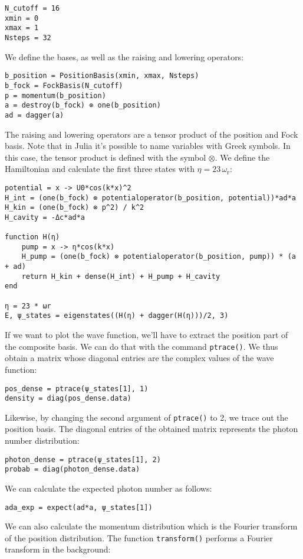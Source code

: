 \begin{lstlisting}
N_cutoff = 16
xmin = 0
xmax = 1
Nsteps = 32
\end{lstlisting}We define the bases, as well as the raising and lowering operators:

\begin{lstlisting}
b_position = PositionBasis(xmin, xmax, Nsteps)
b_fock = FockBasis(N_cutoff)
p = momentum(b_position)
a = destroy(b_fock) ⊗ one(b_position)
ad = dagger(a)
\end{lstlisting}The raising and lowering operators are a tensor product of the position and Fock basis. Note that in Julia it's possible to name variables with Greek symbols. In this case, the tensor product is defined with the symbol $\otimes$. We define the Hamiltonian and calculate the first three states with $\eta = 23 \, \omega_\text{r}$:

\begin{lstlisting}
potential = x -> U0*cos(k*x)^2
H_int = (one(b_fock) ⊗ potentialoperator(b_position, potential))*ad*a
H_kin = (one(b_fock) ⊗ p^2) / k^2
H_cavity = -Δc*ad*a

function H(η)
    pump = x -> η*cos(k*x)
    H_pump = (one(b_fock) ⊗ potentialoperator(b_position, pump)) * (a + ad)
    return H_kin + dense(H_int) + H_pump + H_cavity
end

η = 23 * ωr
E, ψ_states = eigenstates((H(η) + dagger(H(η)))/2, 3)
\end{lstlisting}If we want to plot the wave function, we'll have to extract the position part of the composite basis. We can do that with the command \texttt{ptrace()}. We thus obtain a matrix whose diagonal entries are the complex values of the wave function:

\begin{lstlisting}
pos_dense = ptrace(ψ_states[1], 1)
density = diag(pos_dense.data)
\end{lstlisting} Likewise, by changing the second argument of \texttt{ptrace()} to 2, we trace out the position basis. The diagonal entries of the obtained matrix represents the photon number distribution:

\begin{lstlisting}
photon_dense = ptrace(ψ_states[1], 2)
probab = diag(photon_dense.data)
\end{lstlisting}We can calculate the expected photon number as follows:

\begin{lstlisting}
ada_exp = expect(ad*a, ψ_states[1])
\end{lstlisting}We can also calculate the momentum distribution which is the Fourier transform of the position distribution. The function \texttt{transform()} performs a Fourier transform in the background:

